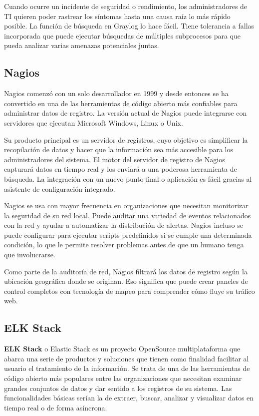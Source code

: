 Cuando ocurre un incidente de seguridad o rendimiento, los administradores de TI quieren poder rastrear los síntomas hasta una causa raíz lo más rápido posible. La función de búsqueda en Graylog lo hace fácil. Tiene tolerancia a fallas incorporada que puede ejecutar búsquedas de múltiples subprocesos para que pueda analizar varias amenazas potenciales juntas.

\subsection{Nagios}

Nagios comenzó con un solo desarrollador en 1999 y desde entonces se ha convertido en una de las herramientas de código abierto más confiables para administrar datos de registro. La versión actual de Nagios puede integrarse con servidores que ejecutan Microsoft Windows, Linux o Unix.

Su producto principal es un servidor de registros, cuyo objetivo es simplificar la recopilación de datos y hacer que la información sea más accesible para los administradores del sistema. El motor del servidor de registro de Nagios capturará datos en tiempo real y los enviará a una poderosa herramienta de búsqueda. La integración con un nuevo punto final o aplicación es fácil gracias al asistente de configuración integrado.

Nagios se usa con mayor frecuencia en organizaciones que necesitan monitorizar la seguridad de su red local. Puede auditar una variedad de eventos relacionados con la red y ayudar a automatizar la distribución de alertas. Nagios incluso se puede configurar para ejecutar scripts predefinidos si se cumple una determinada condición, lo que le permite resolver problemas antes de que un humano tenga que involucrarse.

Como parte de la auditoría de red, Nagios filtrará los datos de registro según la ubicación geográfica donde se originan. Eso significa que puede crear paneles de control completos con tecnología de mapeo para comprender cómo fluye su tráfico web.

\subsection{ELK Stack}

\textbf{ELK Stack} o Elastic Stack es un proyecto OpenSource multiplataforma que abarca una serie de productos y soluciones que tienen como finalidad facilitar al usuario el tratamiento de la información. Se trata de una de las herramientas de código abierto más populares entre las organizaciones que necesitan examinar grandes conjuntos de datos y dar sentido a los registros de su sistema. Las funcionalidades básicas serían la de extraer, buscar, analizar y visualizar datos en tiempo real o de forma asíncrona.

